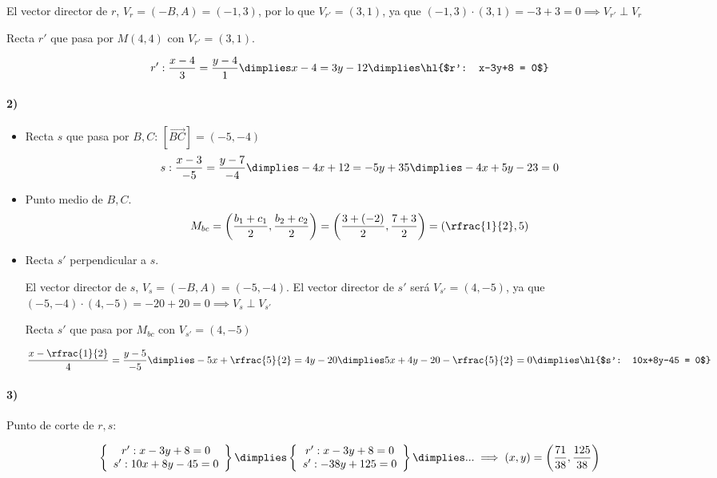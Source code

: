 \documentclass[palatino,nosec,nochap,nobuilddate]{Docencia}
\begin{document}
\begin{problem}[57]
\begin{itemize}
	El vector director de $r$, $V_{r} = (-B,A) =(-1,3)$, por lo que $V_{r'} = (3,1)$, ya que $(-1,3)·(3,1) = -3+3=0 \implies V_{r'}\perp V_r$

	Recta $r'$ que pasa por $M(4,4)$ con $V_{r'} = (3,1)$.

	\[
		r':\frac{x-4}{3} = \frac{y-4}{1} \dimplies x-4 = 3y-12 \dimplies \text{\hl{$r': x-3y+8 = 0$}}
	\]
\end{itemize}

	\paragraph{2)}
\begin{itemize}
	\item Recta $s$ que pasa por $B,C$:
	\subitem $[\overrightarrow{BC}] = (-5,-4)$
		\[s: \displaystyle \frac{x-3}{-5} = \frac{y-7}{-4} \dimplies -4x+12 = -5y+35 \dimplies -4x+5y-23 = 0\]

	\item Punto medio de $B,C$.
	\[
		M_{bc}=\left(\frac{b_1+c_1}{2},\frac{b_2+c_2}{2}\right) = \left( \frac{3+(-2)}{2},\frac{7+3}{2} \right) = (\rfrac{1}{2},5)
	\]

	\item Recta $s'$ perpendicular a $s$. 

	El vector director de $s$, $V_s = (-B,A) = (-5,-4)$.
	El vector director de $s'$ será $V_{s'} = (4,-5)$, ya que $(-5,-4)·(4,-5) = -20+20=0\implies V_s\perp V_{s'}$

	Recta $s'$ que pasa por $M_{bc}$ con $V_{s'} = (4,-5)$

	\[
		\frac{x-\rfrac{1}{2}}{4} = \frac{y-5}{-5} \dimplies -5x+\rfrac{5}{2} = 4y-20 \dimplies 5x+4y-20-\rfrac{5}{2} = 0 \dimplies \text{\hl{$s': 10x+8y-45 = 0$}}
	\]
\end{itemize}

\paragraph{3)} Punto de corte de $r,s$:

\[
\left\{
	\begin{array}{c}
		r': x-3y+8 = 0\\
		s': 10x+8y-45 = 0
	\end{array}
\right\} \dimplies 
\left\{
	\begin{array}{c}
		r': x-3y+8 = 0\\
		s': -38y+125 = 0
	\end{array}
\right\} \dimplies ... \implies (x,y) = \left(\frac{71}{38},\frac{125}{38}\right)
\]


\end{problem}
\end{document}
